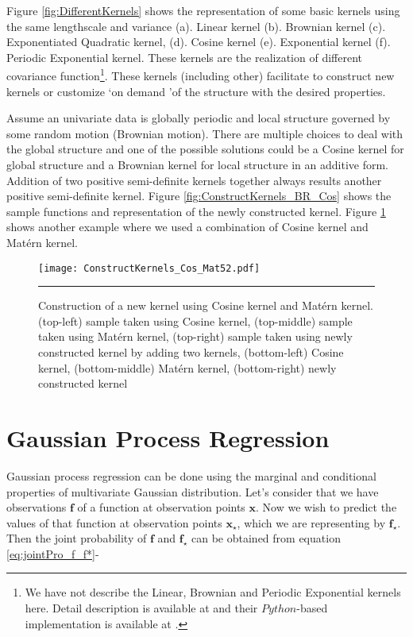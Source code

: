 Figure \ref{fig:DifferentKernels} shows the representation of some basic kernels using the same lengthscale and variance (a). Linear kernel (b). Brownian kernel (c). Exponentiated Quadratic kernel, (d). Cosine kernel (e). Exponential kernel (f). Periodic Exponential kernel. These kernels are the realization of different covariance function\footnote{We have not describe the Linear, Brownian and Periodic Exponential kernels here. Detail description is available at \cite{Rasmussen_and_Williams:2006} and their $Python$-based implementation is available at \cite{gpy2014}.}. These kernels (including other) facilitate to construct new kernels or customize \lq on demand \rq of the structure with the desired properties. 

Assume an univariate data is globally periodic and local structure governed by some random motion (Brownian motion). There are multiple choices to deal with the global structure and one of the possible solutions could be a Cosine kernel for global structure and a Brownian kernel for local structure in an additive form. Addition of two positive semi-definite kernels together always results another positive semi-definite kernel. Figure \ref{fig:ConstructKernels_BR_Cos} shows the sample functions and representation of the newly constructed kernel. Figure \ref{fig:ConstructKernels2} shows another example where we used a combination of Cosine kernel and Mat{\'e}rn kernel.

\begin{figure}[t]
	\centering
		\texttt{[image: ConstructKernels\_Cos\_Mat52.pdf]}
		\rule{35em}{0.5pt}
	\caption[Construction of a new kernel using Cosine kernel and Mat{\'e}rn kernel]
		{Construction of a new kernel using Cosine kernel and Mat{\'e}rn kernel. (top-left) sample taken using Cosine kernel, (top-middle) sample taken using Mat{\'e}rn kernel, (top-right) sample taken using newly constructed kernel by adding two kernels, (bottom-left) Cosine kernel, (bottom-middle) Mat{\'e}rn kernel, (bottom-right) newly constructed kernel} %
	\label{fig:ConstructKernels2}
\end{figure}

\section{Gaussian Process Regression}
Gaussian process regression can be done using the marginal and conditional properties of multivariate Gaussian distribution. Let's consider that we have observations $\mathbf{f}$ of a function at observation points $\mathbf{x}$. Now we wish to predict the values of that function at observation points $\mathbf{x_\star}$, which we are representing by $\mathbf{f_\star}$. Then the joint probability of $\mathbf{f}$ and $\mathbf{f_\star}$ can be obtained from equation \ref{eq:jointPro_f_f*}-

